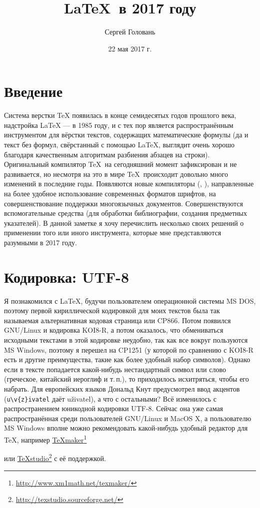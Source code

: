 \documentclass[a4paper,12pt]{article}
\title{\LaTeX\ в 2017 году}
\author{Сергей Головань}
\date{22 мая 2017 г.}
\newcommand\foothref[2]{%
  \href{#1}{#2}\footnote{\url{#1}}%
}
\begin{document}
\maketitle
\tableofcontents

\section{Введение}
Система верстки \TeX{} появилась в конце семидесятых годов прошлого века,
надстройка \LaTeX{} --- в 1985 году, и с тех пор является распространённым
инструментом для вёрстки текстов, содержащих математические формулы (да и текст
без формул, свёрстанный с помощью \LaTeX, выглядит очень хорошо благодаря
качественным алгоритмам разбиения абзацев на строки). Оригинальный компилятор
\TeX\ на сегодняшний момент зафиксирован и не развивается, но несмотря на это
в мире \TeX\ происходит довольно много изменений в последние годы. Появляются
новые компиляторы (\XeTeX{}, \LuaTeX{}), направленные
на более удобное использование
современных форматов шрифтов, на совершенствование поддержки многоязычных
документов. Совершенствуются вспомогательные средства (для обработки
библиографии, создания предметных указателей). В данной заметке я хочу
перечислить несколько своих решений о применении того или иного инструмента,
которые мне представляются разумными в 2017 году.

\section{Кодировка: UTF-8}
Я познакомился с \LaTeX, будучи пользователем операционной системы MS DOS,
поэтому первой кириллической кодировкой для моих текстов была так называемая
альтернативная кодовая страница или CP866. Потом появился GNU/Linux и кодировка
KOI8-R, а потом оказалось, что обмениваться исходными текстами в этой кодировке
неудобно, так как все вокруг пользуются MS Windows, поэтому я перешел на
CP1251 (у которой по сравнению с KOI8-R есть и другие преимущества, такие как
более удобный набор символов). Однако если в тексте попадается какой-нибудь
нестандартный символ или слово (греческое, китайский иероглиф и т.\,п.), то
приходилось исхитряться, чтобы его набрать. Для европейских языков Дональд Кнут
предусмотрел ввод акцентов (\verb|u\v{z}ivatel| даёт u\v{z}ivatel), а что с
остальными? Всё изменилось с распространением юникодной кодировки UTF-8. Сейчас
она уже самая распространённая среди пользователей GNU/Linux и MacOS X,
а пользователю MS Windows вполне можно рекомендовать какой-нибудь удобный
редактор для \TeX, например \foothref{http://www.xm1math.net/texmaker/}{TeXmaker}
или \foothref{http://texstudio.sourceforge.net/}{TeXstudio} с её поддержкой.
\end{document}
